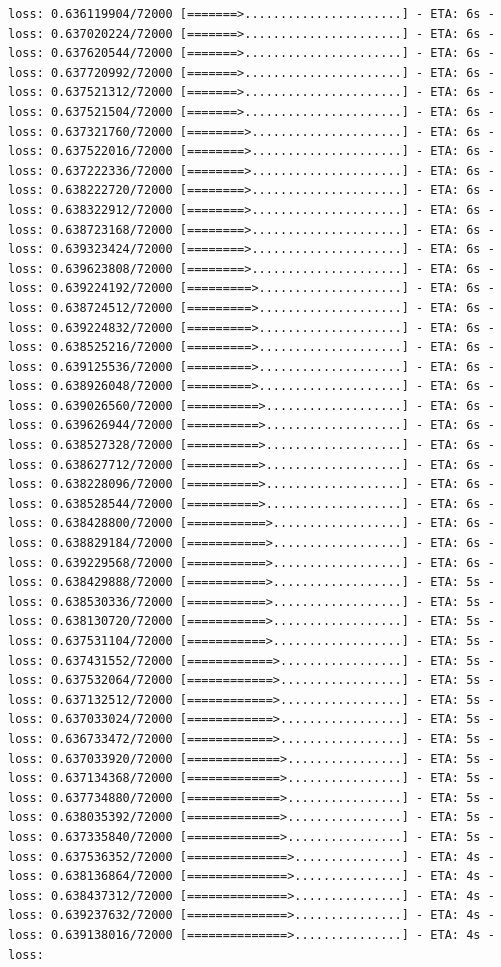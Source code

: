 \documentclass[12pt,fleqn]{article}\usepackage{../../common}
\begin{document}
\begin{verbatim}
loss: 0.636119904/72000 [=======>......................] - ETA: 6s - loss: 0.637020224/72000 [=======>......................] - ETA: 6s - loss: 0.637620544/72000 [=======>......................] - ETA: 6s - loss: 0.637720992/72000 [=======>......................] - ETA: 6s - loss: 0.637521312/72000 [=======>......................] - ETA: 6s - loss: 0.637521504/72000 [=======>......................] - ETA: 6s - loss: 0.637321760/72000 [========>.....................] - ETA: 6s - loss: 0.637522016/72000 [========>.....................] - ETA: 6s - loss: 0.637222336/72000 [========>.....................] - ETA: 6s - loss: 0.638222720/72000 [========>.....................] - ETA: 6s - loss: 0.638322912/72000 [========>.....................] - ETA: 6s - loss: 0.638723168/72000 [========>.....................] - ETA: 6s - loss: 0.639323424/72000 [========>.....................] - ETA: 6s - loss: 0.639623808/72000 [========>.....................] - ETA: 6s - loss: 0.639224192/72000 [=========>....................] - ETA: 6s - loss: 0.638724512/72000 [=========>....................] - ETA: 6s - loss: 0.639224832/72000 [=========>....................] - ETA: 6s - loss: 0.638525216/72000 [=========>....................] - ETA: 6s - loss: 0.639125536/72000 [=========>....................] - ETA: 6s - loss: 0.638926048/72000 [=========>....................] - ETA: 6s - loss: 0.639026560/72000 [==========>...................] - ETA: 6s - loss: 0.639626944/72000 [==========>...................] - ETA: 6s - loss: 0.638527328/72000 [==========>...................] - ETA: 6s - loss: 0.638627712/72000 [==========>...................] - ETA: 6s - loss: 0.638228096/72000 [==========>...................] - ETA: 6s - loss: 0.638528544/72000 [==========>...................] - ETA: 6s - loss: 0.638428800/72000 [===========>..................] - ETA: 6s - loss: 0.638829184/72000 [===========>..................] - ETA: 6s - loss: 0.639229568/72000 [===========>..................] - ETA: 6s - loss: 0.638429888/72000 [===========>..................] - ETA: 5s - loss: 0.638530336/72000 [===========>..................] - ETA: 5s - loss: 0.638130720/72000 [===========>..................] - ETA: 5s - loss: 0.637531104/72000 [===========>..................] - ETA: 5s - loss: 0.637431552/72000 [============>.................] - ETA: 5s - loss: 0.637532064/72000 [============>.................] - ETA: 5s - loss: 0.637132512/72000 [============>.................] - ETA: 5s - loss: 0.637033024/72000 [============>.................] - ETA: 5s - loss: 0.636733472/72000 [============>.................] - ETA: 5s - loss: 0.637033920/72000 [=============>................] - ETA: 5s - loss: 0.637134368/72000 [=============>................] - ETA: 5s - loss: 0.637734880/72000 [=============>................] - ETA: 5s - loss: 0.638035392/72000 [=============>................] - ETA: 5s - loss: 0.637335840/72000 [=============>................] - ETA: 5s - loss: 0.637536352/72000 [==============>...............] - ETA: 4s - loss: 0.638136864/72000 [==============>...............] - ETA: 4s - loss: 0.638437312/72000 [==============>...............] - ETA: 4s - loss: 0.639237632/72000 [==============>...............] - ETA: 4s - loss: 0.639138016/72000 [==============>...............] - ETA: 4s - loss: 
\end{verbatim}
\end{document}
